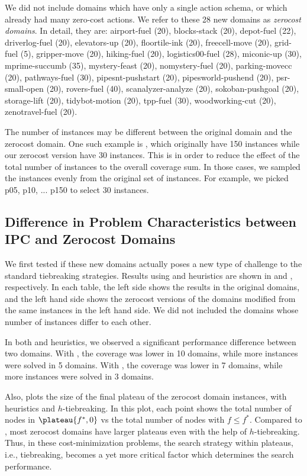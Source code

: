 We did not
include domains which have only a single action schema, or which already had many zero-cost actions.
We refer to these 28 new domains as \emph{zerocost domains}.
In detail, they are:
airport-fuel (20), blocks-stack (20), depot-fuel (22), driverlog-fuel (20),
elevators-up (20), floortile-ink (20), freecell-move (20), grid-fuel (5),
gripper-move (20), hiking-fuel (20), logistics00-fuel (28), miconic-up (30),
mprime-succumb (35), mystery-feast (20), nomystery-fuel (20),
parking-movecc (20), pathways-fuel (30), pipesnt-pushstart (20),
pipesworld-pushend (20), psr-small-open (20), rovers-fuel (40),
scanalyzer-analyze (20), sokoban-pushgoal (20), storage-lift (20),
tidybot-motion (20), tpp-fuel (30), woodworking-cut (20),
zenotravel-fuel (20).

The number of instances may be different between the original domain and
the zerocost domain. One such example is , which
originally have 150 instances while our zerocost version have
30 instances.
This is in order to reduce the effect of the total number of instances
to the overall coverage sum.
In those cases, we sampled the instances evenly from the original set
of instances. For example, we picked p05, p10, ... p150 to select 30 instances.

\subsection{Difference in Problem Characteristics between IPC and Zerocost Domains}

We first tested if these new domains actually poses a new type of challenge to the
standard tiebreaking strategies. Results using \lmcut and \mands
heuristics are shown in  and
, respectively. In each table, the left
side shows the results in the original domains, and the left hand side
shows the zerocost versions of the domains modified from the same
instances in the left hand side. We did not included the domains whose
number of instances differ to each other.

In both \lmcut and \mands heuristics, we observed a significant
performance difference between two domains. With \lmcut, the coverage
was lower in 10 domains, while more instances were solved
in 5 domains. With \mands, the coverage was lower in 7 domains, while
more instances were solved in 3 domains.

Also,  plots the size of the final plateau of the
zerocost domain instances, with \lmcut heuristics and $h$-tiebreaking. In this plot,
each point shows the total number of nodes in $\plateau{f^*,0}$ vs the
total number of nodes with $f\leq f^*$. Compared to ,
most zerocost domains have larger plateaus even with the help of
$h$-tiebreaking.  Thus, in these cost-minimization problems, the search
strategy within plateaus, i.e., tiebreaking, becomes a yet more critical
factor which determines the search performance.

